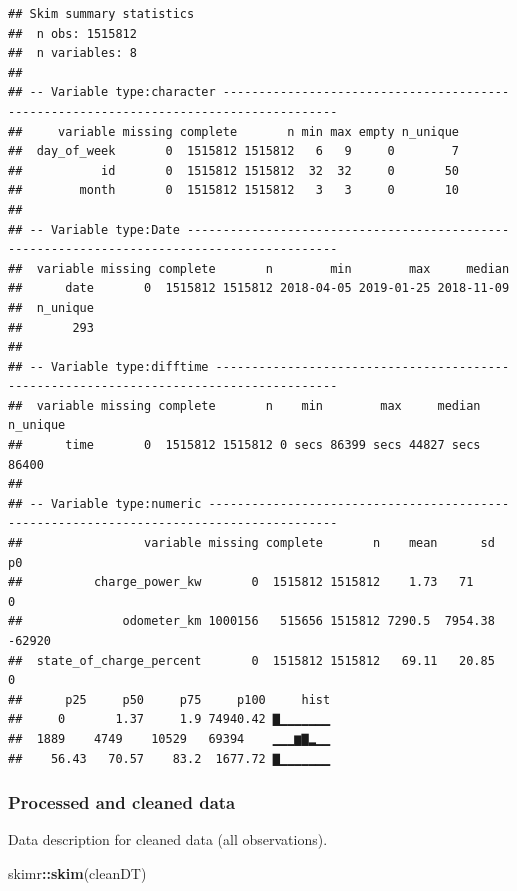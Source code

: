 \documentclass[]{article}
\newenvironment{Shaded}{\begin{snugshade}}{\end{snugshade}}
\newcommand{\KeywordTok}[1]{\textcolor[rgb]{0.13,0.29,0.53}{\textbf{#1}}}
\newcommand{\NormalTok}[1]{#1}
\newcommand{\OperatorTok}[1]{\textcolor[rgb]{0.81,0.36,0.00}{\textbf{#1}}}
\begin{document}
\begin{verbatim}
## Skim summary statistics
##  n obs: 1515812 
##  n variables: 8 
## 
## -- Variable type:character --------------------------------------------------------------------------------------
##     variable missing complete       n min max empty n_unique
##  day_of_week       0  1515812 1515812   6   9     0        7
##           id       0  1515812 1515812  32  32     0       50
##        month       0  1515812 1515812   3   3     0       10
## 
## -- Variable type:Date -------------------------------------------------------------------------------------------
##  variable missing complete       n        min        max     median
##      date       0  1515812 1515812 2018-04-05 2019-01-25 2018-11-09
##  n_unique
##       293
## 
## -- Variable type:difftime ---------------------------------------------------------------------------------------
##  variable missing complete       n    min        max     median n_unique
##      time       0  1515812 1515812 0 secs 86399 secs 44827 secs    86400
## 
## -- Variable type:numeric ----------------------------------------------------------------------------------------
##                 variable missing complete       n    mean      sd     p0
##          charge_power_kw       0  1515812 1515812    1.73   71         0
##              odometer_km 1000156   515656 1515812 7290.5  7954.38 -62920
##  state_of_charge_percent       0  1515812 1515812   69.11   20.85      0
##      p25     p50     p75     p100     hist
##     0       1.37     1.9 74940.42 ▇▁▁▁▁▁▁▁
##  1889    4749    10529   69394    ▁▁▁▆▇▂▁▁
##    56.43   70.57    83.2  1677.72 ▇▁▁▁▁▁▁▁
\end{verbatim}

\hypertarget{processedCheck}{%
\subsubsection{Processed and cleaned data}\label{processedCheck}}

Data description for cleaned data (all observations).

\begin{Shaded}
\begin{Highlighting}[]
\NormalTok{skimr}\OperatorTok{::}\KeywordTok{skim}\NormalTok{(cleanDT)}
\end{Highlighting}
\end{Shaded}
\end{document}
